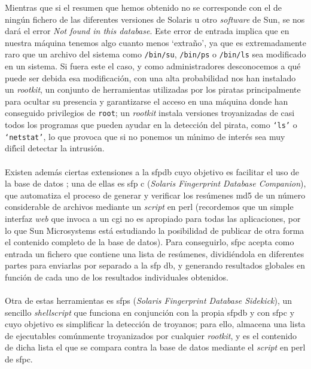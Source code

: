 Mientras que si el resumen que hemos obtenido no se corresponde con el de
ning\'un fichero de las diferentes versiones de Solaris u otro {\it software} de
Sun, se nos dar\'a el error {\it Not found in this database}. Este error de
entrada implica que en nuestra m\'aquina tenemos algo cuanto menos `extra\~no',
ya que es extremadamente raro que un archivo del sistema como {\tt /bin/su},
{\tt /bin/ps} o {\tt /bin/ls} sea modificado en un sistema. Si fuera este el
caso, y como administradores desconocemos a qu\'e puede ser debida esa 
modificaci\'on, con una alta probabilidad nos han instalado un {\it rootkit}, un
conjunto de herramientas utilizadas por los piratas principalmente para ocultar 
su presencia y garantizarse el acceso en una m\'aquina donde han conseguido 
privilegios de {\tt root}; un {\it rootkit} instala versiones troyanizadas de 
casi todos los programas que pueden ayudar en la detecci\'on del pirata, como 
{\tt `ls'} o {\tt `netstat'}, lo que provoca que si no ponemos un m\'{\i}nimo
de inter\'es sea muy dif\'{\i}cil detectar la intrusi\'on.\\
\\Existen adem\'as ciertas extensiones a la sfp{\sc db} cuyo objetivo es 
facilitar el uso de la base de datos \cite{kn:vas01}; una de ellas es sfp{\sc 
c} ({\it Solaris Fingerprint Database Companion}), que automatiza el proceso de 
generar y verificar los res\'umenes {\sc md5} de un n\'umero considerable de 
archivos mediante un {\it script} en {\sc perl} (recordemos que un simple 
interfaz {\it
web} que invoca a un {\sc cgi} no es apropiado para todas las aplicaciones, por
lo que Sun Microsystems est\'a estudiando la posibilidad de publicar de otra
forma el contenido completo de la base de datos). Para conseguirlo, sfp{\sc c} 
acepta como entrada un fichero que contiene una lista de res\'umenes, 
dividi\'endola en diferentes partes para enviarlas por separado a la sfp{\sc 
db}, y generando resultados globales en funci\'on de cada uno de los resultados
individuales obtenidos.\\
\\Otra de estas herramientas es sfp{\sc s} ({\it Solaris Fingerprint Database
Sidekick}), un sencillo {\it shellscript} que funciona en conjunci\'on con la
propia sfp{\sc db} y con sfp{\sc c} y cuyo objetivo es simplificar la 
detecci\'on de troyanos; para ello, almacena una lista de ejecutables 
com\'unmente troyanizados por cualquier {\it rootkit}, y es el contenido de 
dicha lista el que se compara contra la base de datos mediante el {\it script}
en {\sc perl} de sfp{\sc c}.\\
